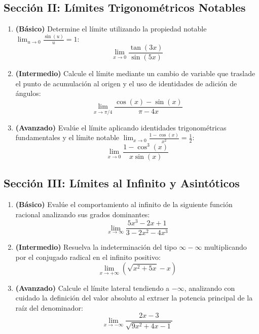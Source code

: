 \documentclass[11pt,letterpaper]{article}
\begin{document}
\subsection{Sección II: Límites Trigonométricos Notables}
\begin{enumerate}[label=\textbf{\arabic*.}]
    \setcounter{enumerate}{\value{enumi}}
    \item \textbf{(Básico)} Determine el límite utilizando la propiedad notable $\lim_{u\to 0} \frac{\sin(u)}{u} = 1$:
    $$\lim_{x\to 0} \frac{\tan(3x)}{\sin(5x)}$$
    
    \item \textbf{(Intermedio)} Calcule el límite mediante un cambio de variable que traslade el punto de acumulación al origen y el uso de identidades de adición de ángulos:
    $$\lim_{x\to \pi/4} \frac{\cos(x) - \sin(x)}{\pi - 4x}$$
    
    \item \textbf{(Avanzado)} Evalúe el límite aplicando identidades trigonométricas fundamentales y el límite notable $\lim_{x\to 0} \frac{1-\cos(x)}{x^2} = \frac{1}{2}$:
    $$\lim_{x\to 0} \frac{1 - \cos^3(x)}{x\sin(x)}$$
\end{enumerate}

\subsection{Sección III: Límites al Infinito y Asintóticos}
\begin{enumerate}[label=\textbf{\arabic*.}]
    \setcounter{enumerate}{\value{enumi}}
    \item \textbf{(Básico)} Evalúe el comportamiento al infinito de la siguiente función racional analizando sus grados dominantes:
    $$\lim_{x\to \infty} \frac{5x^3 - 2x + 1}{3 - 2x^2 - 4x^3}$$
    
    \item \textbf{(Intermedio)} Resuelva la indeterminación del tipo $\infty - \infty$ multiplicando por el conjugado radical en el infinito positivo:
    $$\lim_{x\to +\infty} \left( \sqrt{x^2 + 5x} - x \right)$$
    
    \item \textbf{(Avanzado)} Calcule el límite lateral tendiendo a $-\infty$, analizando con cuidado la definición del valor absoluto al extraer la potencia principal de la raíz del denominador:
    $$\lim_{x\to -\infty} \frac{2x - 3}{\sqrt{9x^2 + 4x - 1}}$$
\end{enumerate}
\end{document}
